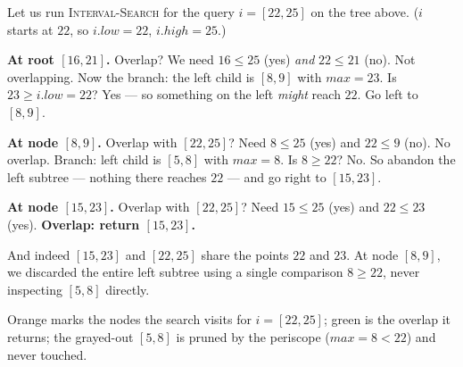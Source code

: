\begin{labbox}
Let us run \textsc{Interval-Search} for the query $i = [22, 25]$ on the tree
above. ($i$ starts at $22$, so $i.\mathit{low} = 22$, $i.\mathit{high} = 25$.)

\textbf{At root $[16,21]$.} Overlap? We need $16 \le 25$ (yes) \emph{and}
$22 \le 21$ (no). Not overlapping. Now the branch: the left child is $[8,9]$ with
$\mathit{max} = 23$. Is $23 \ge i.\mathit{low} = 22$? Yes --- so something on the
left \emph{might} reach $22$. Go left to $[8,9]$.

\textbf{At node $[8,9]$.} Overlap with $[22,25]$? Need $8 \le 25$ (yes) and
$22 \le 9$ (no). No overlap. Branch: left child is $[5,8]$ with $\mathit{max} =
8$. Is $8 \ge 22$? No. So abandon the left subtree --- nothing there reaches
$22$ --- and go right to $[15,23]$.

\textbf{At node $[15,23]$.} Overlap with $[22,25]$? Need $15 \le 25$ (yes) and
$22 \le 23$ (yes). \textbf{Overlap: return $[15,23]$.}

And indeed $[15,23]$ and $[22,25]$ share the points $22$ and $23$. At node $[8,9]$, we discarded the entire left subtree using a
single comparison $8 \ge 22$, never inspecting $[5,8]$ directly.

\begin{center}
\end{center}

Orange marks the nodes the search visits for $i = [22,25]$; green is the
overlap it returns; the grayed-out $[5,8]$ is pruned by the periscope
($\mathit{max} = 8 < 22$) and never touched.
\end{labbox}

